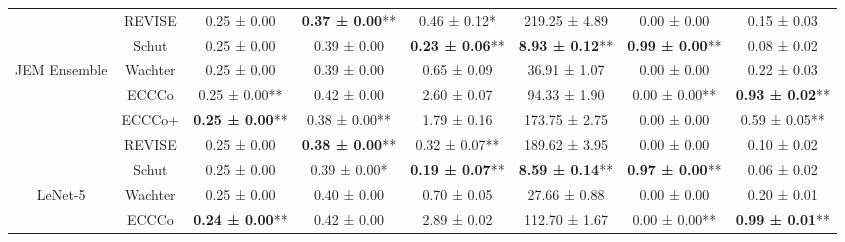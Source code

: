 \begin{table}
{\begin{tabular}[t]{cccccccc}
 & REVISE & 0.25 ± 0.00\hphantom{*}\hphantom{*} & \textbf{0.37 ± 0.00}** & 0.46 ± 0.12*\hphantom{*} & 219.25 ± 4.89\hphantom{*}\hphantom{*} & 0.00 ± 0.00\hphantom{*}\hphantom{*} & 0.15 ± 0.03\hphantom{*}\hphantom{*}\\

 & Schut & 0.25 ± 0.00\hphantom{*}\hphantom{*} & 0.39 ± 0.00\hphantom{*}\hphantom{*} & \textbf{0.23 ± 0.06}** & \textbf{8.93 ± 0.12}** & \textbf{0.99 ± 0.00}** & 0.08 ± 0.02\hphantom{*}\hphantom{*}\\

\multirow[t]{-5}{*}{\centering\arraybackslash JEM Ensemble} & Wachter & 0.25 ± 0.00\hphantom{*}\hphantom{*} & 0.39 ± 0.00\hphantom{*}\hphantom{*} & 0.65 ± 0.09\hphantom{*}\hphantom{*} & 36.91 ± 1.07\hphantom{*}\hphantom{*} & 0.00 ± 0.00\hphantom{*}\hphantom{*} & 0.22 ± 0.03\hphantom{*}\hphantom{*}\\
\cmidrule{1-8}
 & ECCCo & 0.25 ± 0.00** & 0.42 ± 0.00\hphantom{*}\hphantom{*} & 2.60 ± 0.07\hphantom{*}\hphantom{*} & 94.33 ± 1.90\hphantom{*}\hphantom{*} & 0.00 ± 0.00** & \textbf{0.93 ± 0.02}**\\

 & ECCCo+ & \textbf{0.25 ± 0.00}** & 0.38 ± 0.00** & 1.79 ± 0.16\hphantom{*}\hphantom{*} & 173.75 ± 2.75\hphantom{*}\hphantom{*} & 0.00 ± 0.00\hphantom{*}\hphantom{*} & 0.59 ± 0.05**\\

 & REVISE & 0.25 ± 0.00\hphantom{*}\hphantom{*} & \textbf{0.38 ± 0.00}** & 0.32 ± 0.07** & 189.62 ± 3.95\hphantom{*}\hphantom{*} & 0.00 ± 0.00\hphantom{*}\hphantom{*} & 0.10 ± 0.02\hphantom{*}\hphantom{*}\\

 & Schut & 0.25 ± 0.00\hphantom{*}\hphantom{*} & 0.39 ± 0.00*\hphantom{*} & \textbf{0.19 ± 0.07}** & \textbf{8.59 ± 0.14}** & \textbf{0.97 ± 0.00}** & 0.06 ± 0.02\hphantom{*}\hphantom{*}\\

\multirow[t]{-5}{*}{\centering\arraybackslash LeNet-5} & Wachter & 0.25 ± 0.00\hphantom{*}\hphantom{*} & 0.40 ± 0.00\hphantom{*}\hphantom{*} & 0.70 ± 0.05\hphantom{*}\hphantom{*} & 27.66 ± 0.88\hphantom{*}\hphantom{*} & 0.00 ± 0.00\hphantom{*}\hphantom{*} & 0.20 ± 0.01\hphantom{*}\hphantom{*}\\
\cmidrule{1-8}
 & ECCCo & \textbf{0.24 ± 0.00}** & 0.42 ± 0.00\hphantom{*}\hphantom{*} & 2.89 ± 0.02\hphantom{*}\hphantom{*} & 112.70 ± 1.67\hphantom{*}\hphantom{*} & 0.00 ± 0.00** & \textbf{0.99 ± 0.01}**\\


\end{tabular}}
\end{table}
